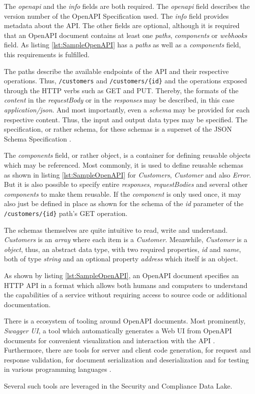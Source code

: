The \emph{openapi} and the \emph{info} fields are both required. The \emph{openapi} field describes the version number of the OpenAPI Specification used. The \emph{info} field provides metadata about the API. The other fields are optional, although it is required that an OpenAPI document contains at least one \emph{paths}, \emph{components} or \emph{webhooks} field. As listing \ref{lst:SampleOpenAPI} has a \emph{paths} as well as a \emph{components} field, this requirements is fulfilled.\par 
The paths describe the available endpoints of the API and their respective operations. Thus, \lstinline|/customers| and \lstinline|/customers/{id}| and the operations exposed through the HTTP verbs such as GET and PUT. Thereby, the formats of the \emph{content} in the \emph{requestBody} or in the \emph{responses} may be described, in this case \emph{application/json}. And most importantly, even a \emph{schema} may be provided for each respective content. Thus, the input and output data types may be specified. The specification, or rather schema, for these schemas is a superset of the JSON Schema Specification \cite{OpenAPISubset}.\par 
The \emph{components} field, or rather object, is a container for defining reusable objects which may be referenced. Most commonly, it is used to define reusable schemas as shown in listing \ref{lst:SampleOpenAPI} for \emph{Customers}, \emph{Customer} and also \emph{Error}. But it is also possible to specify entire \emph{responses}, \emph{requestBodies} and several other \emph{components} to make them reusable. If the \emph{component} is only used once, it may also just be defined in place as shown for the schema of the \emph{id} parameter of the \lstinline|/customers/{id}| path's GET operation.\par
The schemas themselves are quite intuitive to read, write and understand. \emph{Customers} is an \emph{array} where each item is a \emph{Customer}. Meanwhile, \emph{Customer} is a \emph{object}, thus, an abstract data type, with two required properties, \emph{id} and \emph{name}, both of type \emph{string} and an optional property \emph{address} which itself is an object.\par
As shown by listing \ref{lst:SampleOpenAPI}, an OpenAPI document specifies an HTTP API in a format which allows both humans and computers to understand the capabilities of a service without requiring access to source code or additional documentation.\par
There is a ecosystem of tooling around OpenAPI documents. Most prominently, \emph{Swagger UI}, a tool which automatically generates a Web UI from OpenAPI documents for convenient visualization and interaction with the API \cite{SwaggerUI}. Furthermore, there are tools for server and client code generation, for request and response validation, for document serialization and deserialization and for testing in various programming languages \cite{OpenAPISubset}.\par
Several such tools are leveraged in the Security and Compliance Data Lake.\\

